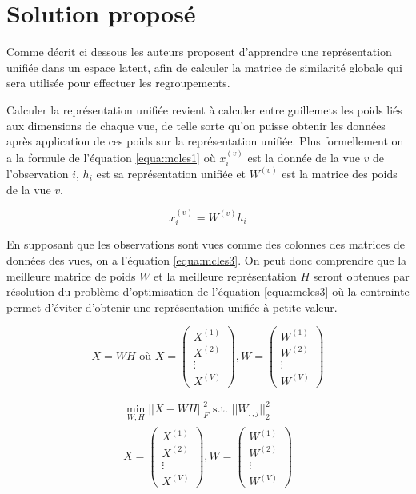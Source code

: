 \documentclass[12pt, french, latin.medieval, a4paper]{report}
\begin{document}
	\section{Solution proposé}
	Comme décrit ci dessous les auteurs proposent d'apprendre une représentation unifiée dans un espace latent, afin de calculer la matrice de similarité globale qui sera utilisée pour effectuer les regroupements.

	Calculer la représentation unifiée revient à calculer entre guillemets les poids liés aux dimensions de chaque vue, de telle sorte qu'on puisse obtenir les données après application de ces poids sur la représentation unifiée. Plus formellement on a la formule de l'équation \ref{equa:mcles1} où $x_i^{(v)}$ est la donnée de la vue $v$ de l'observation $i$, $h_i$ est sa représentation unifiée et $W^{(v)}$ est la matrice des poids de la vue $v$.
    
	\begin{equation}
    	x_i^{(v)} = W^{(v)} h_i
    	\label{equa:mcles1}
	\end{equation}
    
	En supposant que les observations sont vues comme des colonnes des matrices de données des vues, on a l'équation \ref{equa:mcles3}. On peut donc comprendre que la meilleure matrice de poids $W$ et la meilleure représentation $H$ seront obtenues par résolution du problème d'optimisation de l'équation \ref{equa:mcles3} où la contrainte permet d'éviter d'obtenir une représentation unifiée à petite valeur.
    
	\begin{equation}
    	X = WH \text{ où } X = \begin{pmatrix} X^{(1)}\\X^{(2)}\\\vdots\\X^{(V)} \end{pmatrix}, W = \begin{pmatrix} W^{(1)}\\W^{(2)}\\\vdots\\W^{(V)}\end{pmatrix}
    	\label{equa:mcles2}
	\end{equation}

	\begin{equation}
    	\begin{aligned}
        	\min_{W,H} {|| X - WH ||}_F^2 \text{  s.t. ${|| W_{:,j} ||}_2^2$} \\
        	X = \begin{pmatrix} X^{(1)}\\X^{(2)}\\\vdots\\X^{(V)} \end{pmatrix}, W = \begin{pmatrix} W^{(1)}\\W^{(2)}\\\vdots\\W^{(V)}\end{pmatrix}
    	\end{aligned}
    	\label{equa:mcles3}
	\end{equation}
\end{document}
